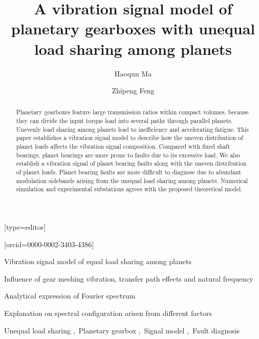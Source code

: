 \documentclass[a4paper,fleqn]{cas-sc}%
\begin{document}
\let\WriteBookmarks\relax
\def\floatpagepagefraction{1}
\def\textpagefraction{.001}
\title[mode = title]{A vibration signal model of planetary gearboxes with unequal load sharing among planets}
\author[1]{Haoqun Ma}[type=editor]
\address[1]{University of Science and Technology Beijing, No.30, Xueyuan Road, Haidian District, Beijing.}
\author[1]{Zhipeng Feng}[orcid=0000-0002-3403-4386]
\cormark[1]
%
%
% 
\begin{abstract}
    Planetary gearboxes feature large transmission ratios within compact volumes, because they can divide the input torque load into several paths through parallel planets. Unevenly load sharing among planets lead to inefficiency and accelerating fatigue. This paper establishes a vibration signal model to describe how the uneven distribution of planet loads affects the vibration signal composition. Compared with fixed shaft bearings, planet bearings are more prone to faults due to its excessive load. We also establish a vibration signal of planet bearing faults along with the uneven distribution of planet loads. Planet bearing faults are more difficult to diagnose due to abundant modulation sidebands arising from the unequal load sharing among planets. Numerical simulation and experimental substations agrees with the proposed theoretical model.
\end{abstract}
\begin{highlights}
    \item Vibration signal model of equal load sharing among planets
    \item Influence of gear meshing vibration, transfer path effects and natural frequency
    \item Analytical expression of Fourier spectrum 
    \item Explanation on spectral configuration arisen from different factors
\end{highlights}
\begin{keywords}
    Unequal load sharing \sep\ Planetary gearbox \sep\ Signal model \sep\ Fault diagnosis
\end{keywords}
    
\maketitle
\def\degree{${}^{\circ}$}
\def\myscale{0.5}
\end{document}
